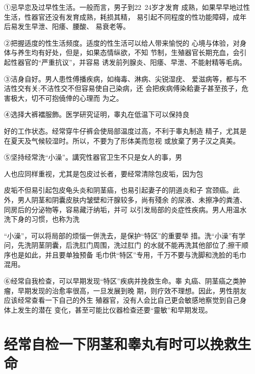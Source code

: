 \documentclass[12pt,UTF8]{ctexbook}
\begin{document}
①忌早恋及过早性生活。一般而言，男子到22~24岁才发育
成熟，如果早早地过性生活，性器官还没有发育成熟，耗损其精，
易引起不同程度的性功能障碍，成年后易发生早泄、阳痿、腰酸、
易衰老等。

②把握适度的性生活频度。适度的性生活可以给人带来愉悦的
心境与体验，对身体与养生均有好处，但是，如果态情纵欲，不知
节制，生殖器官长期充血，会引起性器官的“严重抗议”，并容易
诱发前列腺炎、阳痿、早泄、不能射精等毛病。

③洁身自好。男人患性傅播疾病，如梅毒、淋病、尖锐湿疣、
爱滋病等，都与不洁性交有关;不洁性交不但容易使自己染病，还
会把疾病傅染耠妻子甚至孩子，危害极大，切不可抱僥倖的心理而
为之。

④选择大裤襠服飾。医学研究证明，睾丸在低温下可以保持良

好的工作状态。经常穿牛仔裤会使局部温度过高，不利于睾丸制造
精子，尤其是在夏天及气候较湿时。所以，不要为了形体美而忽视
或放棄了男子汉之真美。

⑤坚持经常洗“小澡”。講究性器官卫生不只是女人的事，男

人也应同样重视，尤其是包皮过长者，要经常清除包皮垢，因为包

皮垢不但易引起包皮龟头炎和阴茎癌，也易引起妻子的阴道炎和子
宫颈癌。此外，男人阴茎和阴囊皮肤内皱壁和汗腺较多，尚有殘余
的尿液、未擦净的粪渣、同房后的分泌物等，容易藏汙纳垢，并可
以引发局部的炎症性疾病。男人用温水洗下身的习惯，也称为洗

“小澡”，可以将局部的烦惱一併洗去，是保护“特区”的重要举
措。洗“小澡”有学问，先洗阴茎阴囊，后洗肛门周围，洗过肛门
的水就不能再洗其他部位了;擦干顺序也是如此，并且要单独预备
毛巾供“特区”专用，千万不要与洗脚和洗脸的毛巾混用。

⑥经常自我检查，可以早期发现“特区”疾病并挽救生命。睾
丸癌、阴茎癌之类肿瘤，早期发现的治愈率很高，一旦发展到晚
期，则疗效不理想。因此，男性朋友应该经常查看一下自己的外生
殖器官，没有人会比自己更会敏感地察觉到自己身体上发生的潜在
变化，甚至可能比仪器检查还要“靈敏”和早期发现。

\section{经常自检一下阴茎和睾丸有时可以挽救生命}
\end{document}
